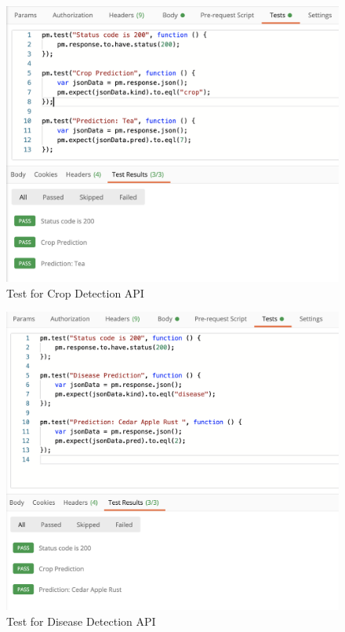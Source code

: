 \documentclass[../Report.tex]{subfiles}
\begin{document}
\begin{figure}[H]
  \centering
  \includegraphics[width=0.7\linewidth]{images/api_crop.png}
  \caption{Test for Crop Detection API}
  \label{fig:test_api_crop}
\end{figure}
\begin{figure}[H]
  \centering
  \includegraphics[width=0.7\linewidth]{images/api_disease.png}
  \caption{Test for Disease Detection API}
  \label{fig:test_api_disease}
\end{figure}
\end{document}
